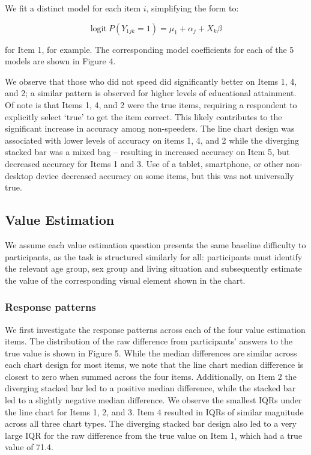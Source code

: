 \documentclass{IEEEcsmag}
\begin{document}
We fit a distinct model for each item \(i\), simplifying the form to:

\begin{equation}
\mbox{logit}\ P(Y_{1jk} = 1) = \mu_1 + \alpha_j + X_k\beta
\end{equation}

for Item 1, for example. The corresponding model coefficients for each of the 5 models are shown in Figure 4.

We observe that those who did not speed did significantly better on Items 1, 4, and 2; a similar pattern is observed for higher levels of educational attainment. Of note is that Items 1, 4, and 2 were the true items, requiring a respondent to explicitly select `true' to get the item correct. This likely contributes to the significant increase in accuracy among non-speeders. The line chart design was associated with lower levels of accuracy on items 1, 4, and 2 while the diverging stacked bar was a mixed bag -- resulting in increased accuracy on Item 5, but decreased accuracy for Items 1 and 3. Use of a tablet, smartphone, or other non-desktop device decreased accuracy on some items, but this was not universally true.

\subsection{Value Estimation}\label{value-estimation}

We assume each value estimation question presents the same baseline difficulty to participants, as the task is structured similarly for all: participants must identify the relevant age group, sex group and living situation and subsequently estimate the value of the corresponding visual element shown in the chart.

\subsubsection{Response patterns}\label{response-patterns}

We first investigate the response patterns across each of the four value estimation items. The distribution of the raw difference from participants' answers to the true value is shown in Figure 5. While the median differences are similar across each chart design for most items, we note that the line chart median difference is closest to zero when summed across the four items. Additionally, on Item 2 the diverging stacked bar led to a positive median difference, while the stacked bar led to a slightly negative median difference. We observe the smallest IQRs under the line chart for Items 1, 2, and 3. Item 4 resulted in IQRs of similar magnitude across all three chart types. The diverging stacked bar design also led to a very large IQR for the raw difference from the true value on Item 1, which had a true value of 71.4.
\end{document}
